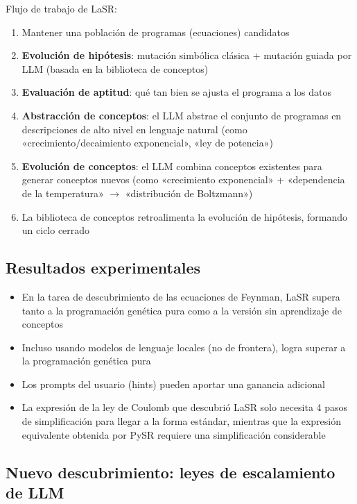 Flujo de trabajo de LaSR:
\begin{enumerate}
    \item Mantener una población de programas (ecuaciones) candidatos
    \item \textbf{Evolución de hipótesis}: mutación simbólica clásica + mutación guiada por LLM (basada en la biblioteca de conceptos)
    \item \textbf{Evaluación de aptitud}: qué tan bien se ajusta el programa a los datos
    \item \textbf{Abstracción de conceptos}: el LLM abstrae el conjunto de programas en descripciones de alto nivel en lenguaje natural (como «crecimiento/decaimiento exponencial», «ley de potencia»)
    \item \textbf{Evolución de conceptos}: el LLM combina conceptos existentes para generar conceptos nuevos (como «crecimiento exponencial» + «dependencia de la temperatura» $\to$ «distribución de Boltzmann»)
    \item La biblioteca de conceptos retroalimenta la evolución de hipótesis, formando un ciclo cerrado
\end{enumerate}

\subsection{Resultados experimentales}

\begin{itemize}
    \item En la tarea de descubrimiento de las ecuaciones de Feynman, LaSR supera tanto a la programación genética pura como a la versión sin aprendizaje de conceptos
    \item Incluso usando modelos de lenguaje locales (no de frontera), logra superar a la programación genética pura
    \item Los prompts del usuario (hints) pueden aportar una ganancia adicional
    \item La expresión de la ley de Coulomb que descubrió LaSR solo necesita 4 pasos de simplificación para llegar a la forma estándar, mientras que la expresión equivalente obtenida por PySR requiere una simplificación considerable
\end{itemize}

\subsection{Nuevo descubrimiento: leyes de escalamiento de LLM}

